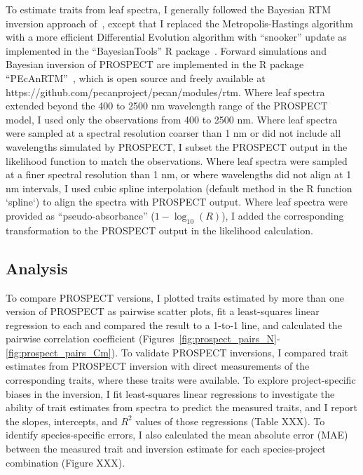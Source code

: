 To estimate traits from leaf spectra, I generally followed the Bayesian RTM inversion approach of~\cite{shiklomanov2016_rse}, except that I replaced the Metropolis-Hastings algorithm with a more efficient Differential Evolution algorithm with ``snooker'' update as implemented in the ``BayesianTools'' R package~\cite{bayesiantools}.
Forward simulations and Bayesian inversion of PROSPECT are implemented in the R package ``PEcAnRTM''~\cite{shiklomanov2016_rse}, which is open source and freely available at https://github.com/pecanproject/pecan/modules/rtm.
Where leaf spectra extended beyond the 400 to 2500 nm wavelength range of the PROSPECT model, I used only the observations from 400 to 2500 nm.
Where leaf spectra were sampled at a spectral resolution coarser than 1 nm or did not include all wavelengths simulated by PROSPECT, I subset the PROSPECT output in the likelihood function to match the observations.
Where leaf spectra were sampled at a finer spectral resolution than 1 nm, or where wavelengths did not align at 1 nm intervals, I used cubic spline interpolation (default method in the R function `spline`) to align the spectra with PROSPECT output.
Where leaf spectra were provided as ``pseudo-absorbance'' ($1 - \log_{10}(R)$), I added the corresponding transformation to the PROSPECT output in the likelihood calculation. 

\subsection{Analysis}

To compare PROSPECT versions, I plotted traits estimated by more than one version of PROSPECT as pairwise scatter plots, fit a least-squares linear regression to each and compared the result to a 1-to-1 line, and calculated the pairwise correlation coefficient (Figures~\ref{fig:prospect_pairs_N}-\ref{fig:prospect_pairs_Cm}).
To validate PROSPECT inversions, I compared trait estimates from PROSPECT inversion with direct measurements of the corresponding traits, where these traits were available.
To explore project-specific biases in the inversion, I fit least-squares linear regressions to investigate the ability of trait estimates from spectra to predict the measured traits, and I report the slopes, intercepts, and $R^2$ values of those regressions (Table XXX). %
To identify species-specific errors, I also calculated the mean absolute error (MAE) between the measured trait and inversion estimate for each species-project combination (Figure XXX). %


